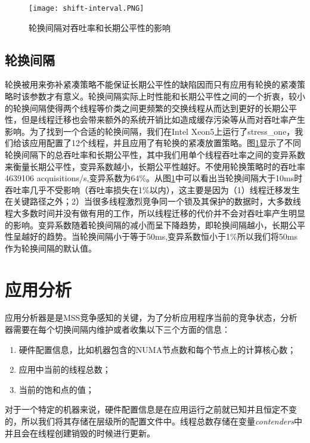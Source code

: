 \begin{figure}[t]
	\centering
	\texttt{[image: shift-interval.PNG]}
	\caption{轮换间隔对吞吐率和长期公平性的影响}
	\label{Fig:shift-interval}
\end{figure}

\subsection{轮换间隔}
轮换被用来弥补紧凑策略不能保证长期公平性的缺陷因而只有应用有轮换的紧凑策略时该参数才有意义。轮换间隔实际上时性能和长期公平性之间的一个折衷，较小的轮换间隔使得两个线程等价类之间更频繁的交换线程从而达到更好的长期公平性，但是线程迁移也会带来额外的系统开销比如造成缓存污染等从而对吞吐率产生影响。为了找到一个合适的轮换间隔，我们在Intel Xeon5上运行了stress\_one，我们给该应用配置了12个线程，并且应用了有轮换的紧凑放置策略。图\ref{Fig:shift-interval}显示了不同轮换间隔下的总吞吐率和长期公平性，其中我们用单个线程吞吐率之间的变异系数来衡量长期公平性，变异系数越小，长期公平性越好。不使用轮换策略时的吞吐率4639106 acquisitions/s,变异系数为64\%。从图\ref{Fig:shift-interval}中可以看出当轮换间隔大于10ms时吞吐率几乎不受影响（吞吐率损失在1\%以内），这主要是因为（1）线程迁移发生在关键路径之外；2）当很多线程激烈竞争同一个锁及其保护的数据时，大多数线程大多数时间并没有做有用的工作，所以线程迁移的代价并不会对吞吐率产生明显的影响。变异系数随着轮换间隔的减小而呈下降趋势，即轮换间隔越小，长期公平性呈越好的趋势。当轮换间隔小于等于50ms,变异系数恒小于1\%所以我们将50ms作为轮换间隔的默认值。

\section{应用分析}
应用分析器是是MSS竞争感知的关键，为了分析应用程序当前的竞争状态，分析器需要在每个切换间隔内维护或者收集以下三个方面的信息：
\begin{enumerate}
  \item 硬件配置信息，比如机器包含的NUMA节点数和每个节点上的计算核心数；
  \item 应用中当前的线程总数；
  \item 当前的饱和点的值；
\end{enumerate}
对于一个特定的机器来说，硬件配置信息是在应用运行之前就已知并且恒定不变的，所以我们将其存储在层级所的配置文件中。线程总数存储在变量\emph{contenders}中并且会在线程创建销毁的时候进行更新。

